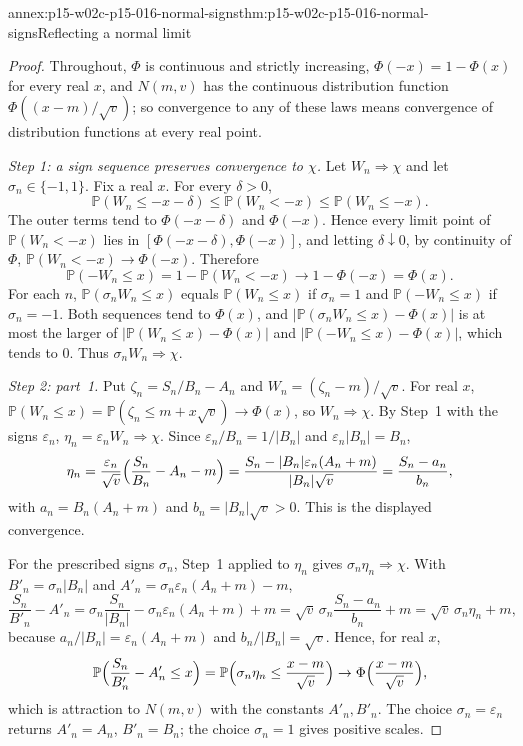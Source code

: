 \begin{annexitem}{annex:p15-w02c-p15-016-normal-signs}{thm:p15-w02c-p15-016-normal-signs}{Reflecting a normal limit}
\begin{proof}
Throughout, \(\Phi\) is continuous and strictly increasing,
\(\Phi(-x)=1-\Phi(x)\) for every real \(x\), and \(N(m,v)\) has the
continuous distribution function \(\Phi((x-m)/\sqrt v)\); so
convergence to any of these laws means convergence of distribution
functions at every real point.

\emph{Step 1: a sign sequence preserves convergence to \(\chi\).}
Let \(W_n\Rightarrow\chi\) and let \(\sigma_n\in\{-1,1\}\). Fix a real
\(x\). For every \(\delta>0\),
\[
 \mathbb P(W_n\leq-x-\delta)\leq\mathbb P(W_n<-x)
 \leq\mathbb P(W_n\leq-x).
\]
The outer terms tend to \(\Phi(-x-\delta)\) and \(\Phi(-x)\). Hence
every limit point of \(\mathbb P(W_n<-x)\) lies in
\([\Phi(-x-\delta),\Phi(-x)]\), and letting \(\delta\downarrow0\),
by continuity of \(\Phi\), \(\mathbb P(W_n<-x)\to\Phi(-x)\).
Therefore
\[
 \mathbb P(-W_n\leq x)=1-\mathbb P(W_n<-x)\to1-\Phi(-x)=\Phi(x).
\]
For each \(n\), \(\mathbb P(\sigma_nW_n\leq x)\) equals
\(\mathbb P(W_n\leq x)\) if \(\sigma_n=1\) and
\(\mathbb P(-W_n\leq x)\) if \(\sigma_n=-1\). Both sequences tend to
\(\Phi(x)\), and \(|\mathbb P(\sigma_nW_n\leq x)-\Phi(x)|\) is at most the
larger of \(|\mathbb P(W_n\leq x)-\Phi(x)|\) and
\(|\mathbb P(-W_n\leq x)-\Phi(x)|\), which tends to \(0\).
Thus \(\sigma_nW_n\Rightarrow\chi\).

\emph{Step 2: part~1.} Put \(\zeta_n=S_n/B_n-A_n\) and
\(W_n=(\zeta_n-m)/\sqrt v\). For real \(x\),
\(\mathbb P(W_n\leq x)=\mathbb P(\zeta_n\leq m+x\sqrt v)\to
\Phi(x)\), so \(W_n\Rightarrow\chi\). By Step~1 with the signs
\(\varepsilon_n\), \(\eta_n=\varepsilon_nW_n\Rightarrow\chi\). Since
\(\varepsilon_n/B_n=1/|B_n|\) and \(\varepsilon_n|B_n|=B_n\),
\[
 \eta_n=\frac{\varepsilon_n}{\sqrt v}
 \Bigl(\frac{S_n}{B_n}-A_n-m\Bigr)
 =\frac{S_n-|B_n|\varepsilon_n(A_n+m)}{|B_n|\sqrt v}
 =\frac{S_n-a_n}{b_n},
\]
with \(a_n=B_n(A_n+m)\) and \(b_n=|B_n|\sqrt v>0\). This is the
displayed convergence.

For the prescribed signs \(\sigma_n\), Step~1 applied to \(\eta_n\)
gives \(\sigma_n\eta_n\Rightarrow\chi\). With
\(B'_n=\sigma_n|B_n|\) and \(A'_n=\sigma_n\varepsilon_n(A_n+m)-m\),
\[
 \frac{S_n}{B'_n}-A'_n
 =\sigma_n\frac{S_n}{|B_n|}-\sigma_n\varepsilon_n(A_n+m)+m
 =\sqrt v\,\sigma_n\frac{S_n-a_n}{b_n}+m
 =\sqrt v\,\sigma_n\eta_n+m ,
\]
because \(a_n/|B_n|=\varepsilon_n(A_n+m)\) and
\(b_n/|B_n|=\sqrt v\). Hence, for real \(x\),
\[
 \mathbb P\Bigl(\frac{S_n}{B'_n}-A'_n\leq x\Bigr)
 =\mathbb P\Bigl(\sigma_n\eta_n\leq\frac{x-m}{\sqrt v}\Bigr)
 \to\Phi\Bigl(\frac{x-m}{\sqrt v}\Bigr),
\]
which is attraction to \(N(m,v)\) with the constants
\(A'_n,B'_n\). The choice \(\sigma_n=\varepsilon_n\) returns
\(A'_n=A_n\), \(B'_n=B_n\); the choice \(\sigma_n=1\) gives positive
scales.


\end{proof}
\end{annexitem}
